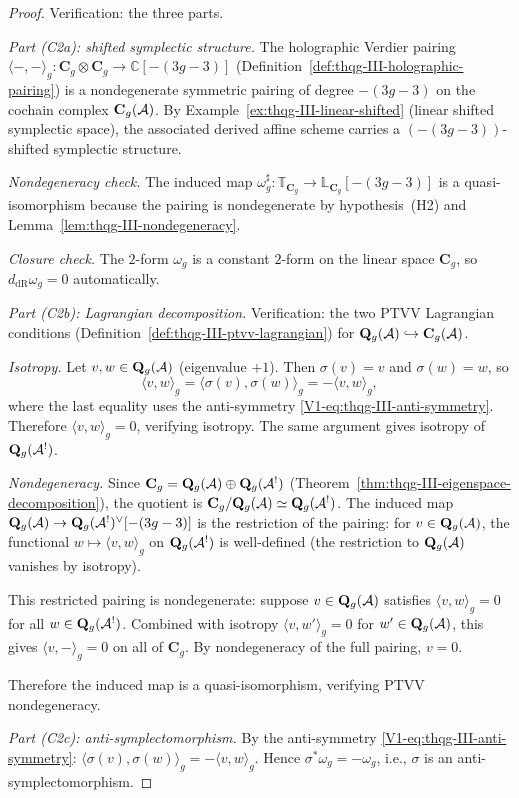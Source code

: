 \begin{proof}
Verification: the three parts.

\emph{Part (C2a): shifted symplectic structure.}
The holographic Verdier pairing
$\langle -, - \rangle_g \colon
\mathbf{C}_g \otimes \mathbf{C}_g \to \mathbb{C}[{-(3g{-}3)}]$
(Definition~\ref{def:thqg-III-holographic-pairing}) is a
nondegenerate symmetric pairing of degree $-(3g-3)$ on the
cochain complex $\mathbf{C}_g(\mathcal{A})$. By
Example~\ref{ex:thqg-III-linear-shifted} (linear shifted
symplectic space), the associated derived affine scheme
carries a $(-(3g-3))$-shifted symplectic structure.

\emph{Nondegeneracy check.}
The induced map $\omega_g^{\sharp} \colon
\mathbb{T}_{\mathbf{C}_g} \to \mathbb{L}_{\mathbf{C}_g}[-(3g-3)]$
is a quasi-isomorphism because the pairing is nondegenerate
by hypothesis~(H2) and
Lemma~\ref{lem:thqg-III-nondegeneracy}.

\emph{Closure check.}
The $2$-form $\omega_g$ is a constant $2$-form on the linear
space $\mathbf{C}_g$, so $d_{\mathrm{dR}} \omega_g = 0$
automatically.

\emph{Part (C2b): Lagrangian decomposition.}
Verification: the two PTVV Lagrangian conditions
(Definition~\ref{def:thqg-III-ptvv-lagrangian}) for
$\mathbf{Q}_g(\mathcal{A}) \hookrightarrow \mathbf{C}_g(\mathcal{A})$.

\emph{Isotropy.}
Let $v, w \in \mathbf{Q}_g(\mathcal{A})$ (eigenvalue $+1$). Then
$\sigma(v) = v$ and $\sigma(w) = w$, so
\[
\langle v, w \rangle_g
= \langle \sigma(v), \sigma(w) \rangle_g
= -\langle v, w \rangle_g,
\]
where the last equality uses the anti-symmetry
\eqref{V1-eq:thqg-III-anti-symmetry}. Therefore
$\langle v, w \rangle_g = 0$, verifying isotropy.
The same argument gives isotropy of $\mathbf{Q}_g(\mathcal{A}^!)$.

\emph{Nondegeneracy.}
Since $\mathbf{C}_g = \mathbf{Q}_g(\mathcal{A}) \oplus
\mathbf{Q}_g(\mathcal{A}^!)$
(Theorem~\ref{thm:thqg-III-eigenspace-decomposition}), the
quotient is
$\mathbf{C}_g / \mathbf{Q}_g(\mathcal{A}) \simeq \mathbf{Q}_g(\mathcal{A}^!)$.
The induced map
$\mathbf{Q}_g(\mathcal{A}) \to \mathbf{Q}_g(\mathcal{A}^!)^{\vee}[-(3g-3)]$
is the restriction of the pairing:
for $v \in \mathbf{Q}_g(\mathcal{A})$, the functional
$w \mapsto \langle v, w \rangle_g$ on
$\mathbf{Q}_g(\mathcal{A}^!)$ is well-defined (the restriction to
$\mathbf{Q}_g(\mathcal{A})$ vanishes by isotropy).

This restricted pairing is nondegenerate: suppose
$v \in \mathbf{Q}_g(\mathcal{A})$ satisfies
$\langle v, w \rangle_g = 0$ for all
$w \in \mathbf{Q}_g(\mathcal{A}^!)$. Combined with isotropy
$\langle v, w' \rangle_g = 0$ for
$w' \in \mathbf{Q}_g(\mathcal{A})$, this gives
$\langle v, - \rangle_g = 0$ on all of $\mathbf{C}_g$.
By nondegeneracy of the full pairing, $v = 0$.

Therefore the induced map is a quasi-isomorphism, verifying
PTVV nondegeneracy.

\emph{Part (C2c): anti-symplectomorphism.}
By the anti-symmetry \eqref{V1-eq:thqg-III-anti-symmetry}:
$\langle \sigma(v), \sigma(w) \rangle_g
= -\langle v, w \rangle_g$.
Hence
$\sigma^* \omega_g = -\omega_g$, i.e., $\sigma$ is an
anti-symplectomorphism.
\end{proof}

